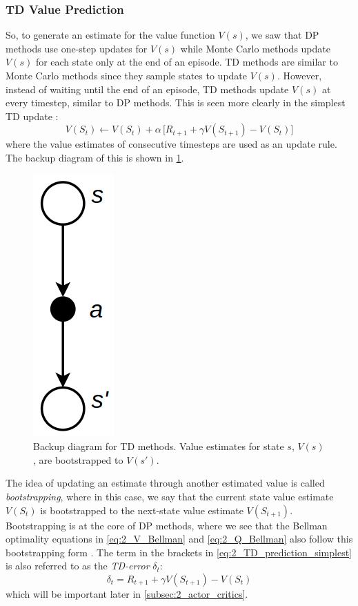 \subsubsection{TD Value Prediction}
\label{subsubsec:2_TD_value_prediction}
So, to generate an estimate for the value function $V(s)$, we saw that DP methods use one-step updates for $V(s)$ while Monte Carlo methods update $V(s)$ for each state only at the end of an episode. TD methods are similar to Monte Carlo methods since they sample states to update $V(s)$. However, instead of waiting until the end of an episode, TD methods update $V(s)$ at every timestep, similar to DP methods. 
This is seen more clearly in the simplest TD update \cite{suttonAndBartoBook}:
\begin{equation}
    V(S_t) \leftarrow V(S_t) + \alpha \, \Big[ R_{t+1} + \gamma V(S_{t+1}) - V(S_t) \Big] \label{eq:2_TD_prediction_simplest}
\end{equation}
where the value estimates of consecutive timesteps are used as an update rule. The backup diagram of this is shown in \cref{fig:2_td_backup}.
\begin{figure}[hbt]
    \centering
    \includegraphics[scale=0.2]{figures/2_RL/2_td_backup.png}
    \caption{Backup diagram for TD methods. Value estimates for state $s$, $V(s)$, are bootstrapped to $V(s')$.}
    \label{fig:2_td_backup}
\end{figure}
The idea of updating an estimate through another estimated value is called \textit{bootstrapping}, where in this case, we say that the current state value estimate $V(S_t)$ is bootstrapped to the next-state value estimate $V(S_{t+1})$. 
Bootstrapping is at the core of DP methods, where we see that the Bellman optimality equations in \eqref{eq:2_V_Bellman} and \eqref{eq:2_Q_Bellman} also follow this bootstrapping form \cite{suttonAndBartoBook}.
The term in the brackets in \eqref{eq:2_TD_prediction_simplest} is also referred to as the \textit{TD-error} $\delta_t$:
\begin{equation}
    \delta_t = R_{t+1} + \gamma V(S_{t+1}) - V(S_t) \label{eq:2_TD_error}
\end{equation}
which will be important later in \cref{subsec:2_actor_critics}. 

